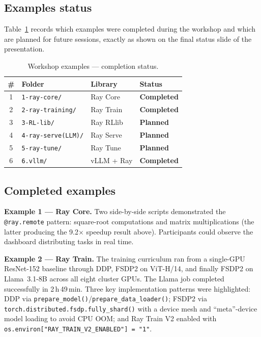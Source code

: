 \documentclass[12pt,a4paper]{article}
\begin{document}
\subsection{Examples status}

Table~\ref{tab:examples} records which examples were completed during
the workshop and which are planned for future sessions, exactly as shown
on the final status slide of the presentation.

\begin{table}[H]
\centering
\caption{Workshop examples --- completion status.}
\label{tab:examples}
\begin{tabular}{clll}
\toprule
\textbf{\#} & \textbf{Folder} & \textbf{Library} & \textbf{Status} \\
\midrule
1 & \texttt{1-ray-core/}       & Ray Core   &
    \textcolor{successcol}{\bfseries Completed} \\
2 & \texttt{2-ray-training/}   & Ray Train  &
    \textcolor{successcol}{\bfseries Completed} \\
3 & \texttt{3-RL-lib/}         & Ray RLlib  &
    \textcolor{plannedcol}{\bfseries Planned} \\
4 & \texttt{4-ray-serve(LLM)/} & Ray Serve  &
    \textcolor{plannedcol}{\bfseries Planned} \\
5 & \texttt{5-ray-tune/}       & Ray Tune   &
    \textcolor{plannedcol}{\bfseries Planned} \\
6 & \texttt{6.vllm/}           & vLLM + Ray &
    \textcolor{successcol}{\bfseries Completed} \\
\bottomrule
\end{tabular}
\end{table}

\subsection{Completed examples}

\textbf{Example 1 --- Ray Core.}
Two side-by-side scripts demonstrated the \texttt{@ray.remote} pattern:
square-root computations and matrix multiplications (the latter
producing the 9.2$\times$ speedup result above). Participants could
observe the dashboard distributing tasks in real time.

\textbf{Example 2 --- Ray Train.}
The training curriculum ran from a single-GPU ResNet-152 baseline
through DDP, FSDP2 on ViT-H/14, and finally FSDP2 on Llama~3.1-8B
across all eight cluster GPUs. The Llama job completed successfully in
2\,h\,49\,min. Three key implementation patterns were highlighted:
DDP via \texttt{prepare\_model()}/\texttt{prepare\_data\_loader()};
FSDP2 via \texttt{torch.distributed.fsdp.fully\_shard()} with a device
mesh and ``meta''-device model loading to avoid CPU OOM; and Ray Train
V2 enabled with \texttt{os.environ["RAY\_TRAIN\_V2\_ENABLED"]~=~"1"}.
\end{document}
